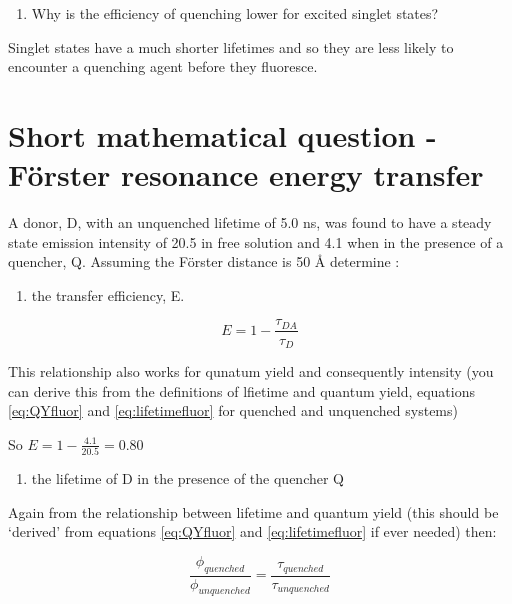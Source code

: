 \documentclass[
]{book}
\providecommand{\tightlist}{%
  \setlength{\itemsep}{0pt}\setlength{\parskip}{0pt}}
\begin{document}
\begin{enumerate}
\def\labelenumi{\arabic{enumi}.}
\tightlist
\item
  Why is the efficiency of quenching lower for excited singlet states?
\end{enumerate}

Singlet states have a much shorter lifetimes and so they are less likely to encounter a quenching agent before they fluoresce.

\hypertarget{sec:FRET}{%
\section{Short mathematical question - Förster resonance energy transfer}\label{sec:FRET}}

A donor, D, with an unquenched lifetime of 5.0 ns, was found to have a steady state emission intensity of 20.5 in free solution and 4.1 when in the presence of a quencher, Q. Assuming the Förster distance is 50 Å determine :

\begin{enumerate}
\def\labelenumi{\arabic{enumi}.}
\tightlist
\item
  the transfer efficiency, E.
\end{enumerate}

\begin{equation}
E = 1 - \frac{\tau_{DA}}{\tau_D}
\label{eq:forsterEtau}
\end{equation}

This relationship also works for qunatum yield and consequently intensity (you can derive this from the definitions of lfietime and quantum yield, equations \eqref{eq:QYfluor} and \eqref{eq:lifetimefluor} for quenched and unquenched systems)

So \(E = 1 - \frac{4.1}{20.5} = 0.80\)

\begin{enumerate}
\def\labelenumi{\arabic{enumi}.}
\tightlist
\item
  the lifetime of D in the presence of the quencher Q
\end{enumerate}

Again from the relationship between lifetime and quantum yield (this should be `derived' from equations \eqref{eq:QYfluor} and \eqref{eq:lifetimefluor} if ever needed) then:

\begin{equation*}
\frac{\phi _{quenched}}{\phi_{unquenched}}=\frac{\tau _{quenched}}{\tau_{unquenched}}
\end{equation*}
\end{document}

